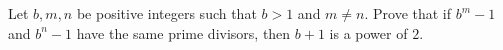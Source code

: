 Let $b, m, n$ be positive integers such that $b>1$ and $m \neq n$. Prove that if $b^m - 1$ and $b^n - 1$ have the same prime divisors, then $b+1$ is a power of $2$.
